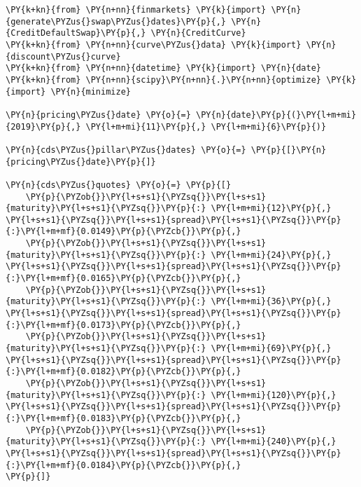 \begin{Answer}
   \begin{tcolorbox}[breakable, size=fbox, boxrule=1pt, pad at break*=1mm,colback=cellbackground, colframe=cellborder]
\begin{Verbatim}[commandchars=\\\{\}]
\PY{k+kn}{from} \PY{n+nn}{finmarkets} \PY{k}{import} \PY{n}{generate\PYZus{}swap\PYZus{}dates}\PY{p}{,} \PY{n}{CreditDefaultSwap}\PY{p}{,} \PY{n}{CreditCurve}
\PY{k+kn}{from} \PY{n+nn}{curve\PYZus{}data} \PY{k}{import} \PY{n}{discount\PYZus{}curve}
\PY{k+kn}{from} \PY{n+nn}{datetime} \PY{k}{import} \PY{n}{date}
\PY{k+kn}{from} \PY{n+nn}{scipy}\PY{n+nn}{.}\PY{n+nn}{optimize} \PY{k}{import} \PY{n}{minimize}

\PY{n}{pricing\PYZus{}date} \PY{o}{=} \PY{n}{date}\PY{p}{(}\PY{l+m+mi}{2019}\PY{p}{,} \PY{l+m+mi}{11}\PY{p}{,} \PY{l+m+mi}{6}\PY{p}{)}

\PY{n}{cds\PYZus{}pillar\PYZus{}dates} \PY{o}{=} \PY{p}{[}\PY{n}{pricing\PYZus{}date}\PY{p}{]}

\PY{n}{cds\PYZus{}quotes} \PY{o}{=} \PY{p}{[}
    \PY{p}{\PYZob{}}\PY{l+s+s1}{\PYZsq{}}\PY{l+s+s1}{maturity}\PY{l+s+s1}{\PYZsq{}}\PY{p}{:} \PY{l+m+mi}{12}\PY{p}{,} \PY{l+s+s1}{\PYZsq{}}\PY{l+s+s1}{spread}\PY{l+s+s1}{\PYZsq{}}\PY{p}{:}\PY{l+m+mf}{0.0149}\PY{p}{\PYZcb{}}\PY{p}{,}
    \PY{p}{\PYZob{}}\PY{l+s+s1}{\PYZsq{}}\PY{l+s+s1}{maturity}\PY{l+s+s1}{\PYZsq{}}\PY{p}{:} \PY{l+m+mi}{24}\PY{p}{,} \PY{l+s+s1}{\PYZsq{}}\PY{l+s+s1}{spread}\PY{l+s+s1}{\PYZsq{}}\PY{p}{:}\PY{l+m+mf}{0.0165}\PY{p}{\PYZcb{}}\PY{p}{,}
    \PY{p}{\PYZob{}}\PY{l+s+s1}{\PYZsq{}}\PY{l+s+s1}{maturity}\PY{l+s+s1}{\PYZsq{}}\PY{p}{:} \PY{l+m+mi}{36}\PY{p}{,} \PY{l+s+s1}{\PYZsq{}}\PY{l+s+s1}{spread}\PY{l+s+s1}{\PYZsq{}}\PY{p}{:}\PY{l+m+mf}{0.0173}\PY{p}{\PYZcb{}}\PY{p}{,}
    \PY{p}{\PYZob{}}\PY{l+s+s1}{\PYZsq{}}\PY{l+s+s1}{maturity}\PY{l+s+s1}{\PYZsq{}}\PY{p}{:} \PY{l+m+mi}{69}\PY{p}{,} \PY{l+s+s1}{\PYZsq{}}\PY{l+s+s1}{spread}\PY{l+s+s1}{\PYZsq{}}\PY{p}{:}\PY{l+m+mf}{0.0182}\PY{p}{\PYZcb{}}\PY{p}{,}
    \PY{p}{\PYZob{}}\PY{l+s+s1}{\PYZsq{}}\PY{l+s+s1}{maturity}\PY{l+s+s1}{\PYZsq{}}\PY{p}{:} \PY{l+m+mi}{120}\PY{p}{,} \PY{l+s+s1}{\PYZsq{}}\PY{l+s+s1}{spread}\PY{l+s+s1}{\PYZsq{}}\PY{p}{:}\PY{l+m+mf}{0.0183}\PY{p}{\PYZcb{}}\PY{p}{,}
    \PY{p}{\PYZob{}}\PY{l+s+s1}{\PYZsq{}}\PY{l+s+s1}{maturity}\PY{l+s+s1}{\PYZsq{}}\PY{p}{:} \PY{l+m+mi}{240}\PY{p}{,} \PY{l+s+s1}{\PYZsq{}}\PY{l+s+s1}{spread}\PY{l+s+s1}{\PYZsq{}}\PY{p}{:}\PY{l+m+mf}{0.0184}\PY{p}{\PYZcb{}}\PY{p}{,}
\PY{p}{]}


\end{Verbatim}
\end{tcolorbox}
\end{Answer}
